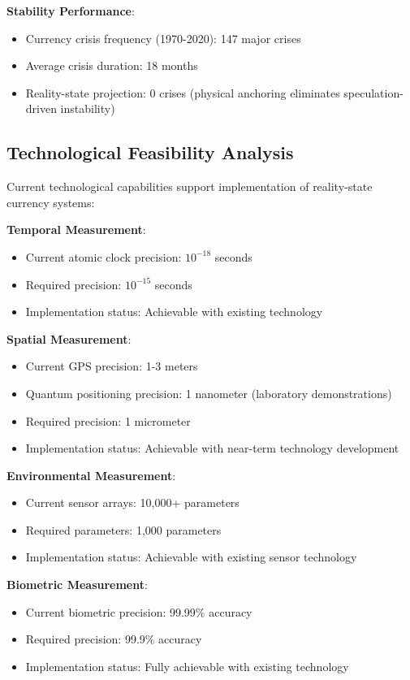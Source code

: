 \documentclass[12pt,a4paper]{article}
\begin{document}
\textbf{Stability Performance}:
\begin{itemize}
\item Currency crisis frequency (1970-2020): 147 major crises
\item Average crisis duration: 18 months
\item Reality-state projection: 0 crises (physical anchoring eliminates speculation-driven instability)
\end{itemize}

\subsection{Technological Feasibility Analysis}

Current technological capabilities support implementation of reality-state currency systems:

\textbf{Temporal Measurement}:
\begin{itemize}
\item Current atomic clock precision: $10^{-18}$ seconds
\item Required precision: $10^{-15}$ seconds
\item Implementation status: Achievable with existing technology
\end{itemize}

\textbf{Spatial Measurement}:
\begin{itemize}
\item Current GPS precision: 1-3 meters
\item Quantum positioning precision: 1 nanometer (laboratory demonstrations)
\item Required precision: 1 micrometer
\item Implementation status: Achievable with near-term technology development
\end{itemize}

\textbf{Environmental Measurement}:
\begin{itemize}
\item Current sensor arrays: 10,000+ parameters
\item Required parameters: 1,000 parameters
\item Implementation status: Achievable with existing sensor technology
\end{itemize}

\textbf{Biometric Measurement}:
\begin{itemize}
\item Current biometric precision: 99.99\% accuracy
\item Required precision: 99.9\% accuracy
\item Implementation status: Fully achievable with existing technology
\end{itemize}
\end{document}
